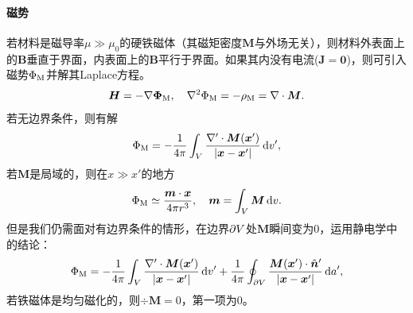 \paragraph{磁势}
若材料是磁导率$\mu\gg\mu_0$的硬铁磁体（其磁矩密度$\bm M$与外场无关），则材料外表面上的$\bm B$垂直于界面，内表面上的$\bm B$平行于界面。如果其内没有电流($\bm J=\bm0$)，则可引入磁势$\Phi_\text M$并解其Laplace方程。
\begin{equation}
    \bm H=-\nabla\bm\Phi_\text M,\quad\nabla^2\Phi_\text M=-\rho_\text M=\nabla\cdot\bm M.
\end{equation}
若无边界条件，则有解
\[
    \Phi_\text M=-\frac1{4\pi}\int_V\frac{\nabla'\cdot\bm M(\bm x')}{|\bm x-\bm x'|}\mathop{}\!\mathrm{d} v',
\]
若$\bm M$是局域的，则在$x\gg x'$的地方
\[
    \Phi_\text M\simeq\frac{\bm m\cdot\bm x}{4\pi r^3},\quad\bm m=\int_V\bm M\mathop{}\!\mathrm{d} v.
\]
但是我们仍需面对有边界条件的情形，在边界$\partial V$处$\bm M$瞬间变为0，运用静电学中的结论：
\begin{equation}
    \label{eqn:PhiM with boundary}
    \Phi_\text M=-\frac1{4\pi}\int_V\frac{\nabla'\cdot\bm M(\bm x')}{|\bm x-\bm x'|}\mathop{}\!\mathrm{d} v'+\frac1{4\pi}\oint_{\partial V}\frac{\bm M(\bm x')\cdot\mathop{}\!\hat{\bm{n}}'}{|\bm x-\bm x'|}\mathop{}\!\mathrm{d} a',
\end{equation}
若铁磁体是均匀磁化的，则$\div\bm M=0$，第一项为0。

